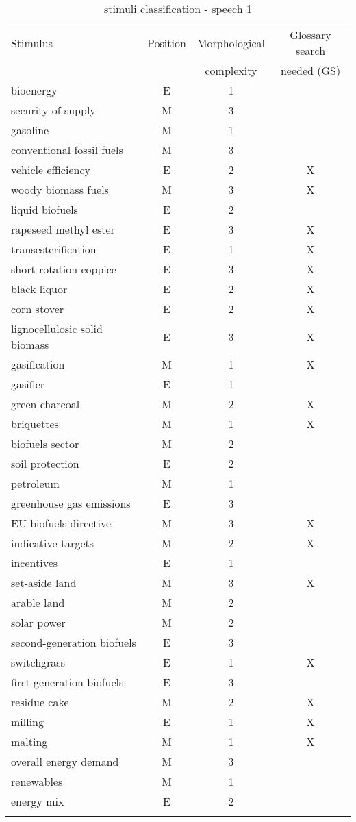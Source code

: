 \documentclass[output=paper]{langsci/langscibook}
\begin{document}
\begin{table}\footnotesize
	\caption{stimuli classification - speech 1\label{tab:prandi:1}}
\begin{tabularx}{\linewidth}{Xccc}
\lsptoprule
{Stimulus} & {Position} & {Morphological} & {Glossary search}\\
		   &            &  complexity      & needed (GS)\\\midrule
bioenergy & E & 1 & \\
security of supply & M & 3 & \\
gasoline & M & 1 & \\
conventional fossil fuels & M & 3 & \\
vehicle efficiency & E & 2 & X\\
woody biomass fuels & M & 3 & X\\
liquid biofuels & E & 2 & \\
rapeseed methyl ester & E & 3 & X\\
transesterification & E & 1 & X\\
short-rotation coppice & E & 3 & X\\
black liquor & E & 2 & X\\
corn stover & E & 2 & X\\
lignocellulosic solid biomass & E & 3 & X\\
gasification & M & 1 & X\\
gasifier & E & 1 & \\
green charcoal & M & 2 & X\\
briquettes & M & 1 & X\\
biofuels sector & M & 2 & \\
soil protection & E & 2 & \\
petroleum & M & 1 & \\
greenhouse gas emissions & E & 3 & \\
EU biofuels directive & M & 3 & X\\
indicative targets & M & 2 & X\\
incentives & E & 1 & \\
set-aside land & M & 3 & X\\
arable land & M & 2 & \\
solar power & M & 2 & \\
second-generation biofuels & E & 3 & \\
switchgrass & E & 1 & X\\
first-generation biofuels & E & 3 & \\
residue cake & M & 2 & X\\
milling & E & 1 & X\\
malting & M & 1 & X\\
overall energy demand & M & 3 & \\
renewables & M & 1 & \\
energy mix & E & 2 & \\
\lspbottomrule
\end{tabularx}
\end{table}
\end{document}

